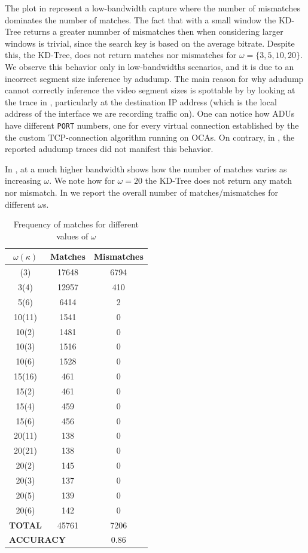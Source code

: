 The plot in  represent a low-bandwidth capture where the
number of mismatches dominates the number of matches. The fact that with a
small window the KD-Tree returns a greater numnber of mismatches then when
considering larger windows is trivial, since the search key is based on the
average bitrate. Despite this, the KD-Tree, does not return matches nor
mismatches for $\omega = \{3, 5, 10, 20\}$.  We observe this behavior only in
low-bandwidths scenarios, and it is due to an incorrect segment size inference
by adudump. The main reason for why adudump cannot correctly inference the
video segment sizes is spottable by  by looking at the trace in
, particularly at the destination IP address (which is the
local address of the interface we are recording traffic on). One can notice how
ADUs have different \texttt{PORT} numbers, one for every virtual connection
established by the the custom TCP-connection algorithm running on OCAs. On
contrary, in \cite{netflix-real-time}, the reported adudump traces did not
manifest this behavior.

In , at a much higher bandwidth shows how the number of
matches varies as increasing $\omega$. We note how for $\omega=20$ the KD-Tree
does not return any match nor mismatch. In  we report the
overall number of matches/mismatches for different $\omega$s.

\begin{small}
\begin{longtable}{|c c c|}
    \caption{Frequency of matches for different values of $\omega$}\label{tab:matches}\\
\hline
$\omega(\kappa)$ &
\textbf{Matches} &
\textbf{Mismatches} \\
\hline
\endhead
\hline
\endfoot
2(3)	& 17648	& 6794 \\
3(4)	& 12957	& 410 \\
5(6)	& 6414	& 2 \\
10(11)	& 1541	& 0 \\
10(2)	& 1481	& 0 \\
10(3)	& 1516	& 0 \\
10(6)	& 1528	& 0 \\
15(16)	& 461	& 0 \\
15(2)	& 461	& 0 \\
15(4)	& 459	& 0 \\
15(6)	& 456	& 0 \\
20(11)	& 138	& 0 \\
20(21)	& 138	& 0 \\
20(2)	& 145	& 0 \\
20(3)	& 137	& 0 \\
20(5)	& 139	& 0 \\
20(6)	& 142	& 0 \\
\hline
\textbf{TOTAL} & 45761 & 7206 \\
\multicolumn{2}{|l}{\textbf{ACCURACY}} & 0.86 \\
\end{longtable}
\end{small}

